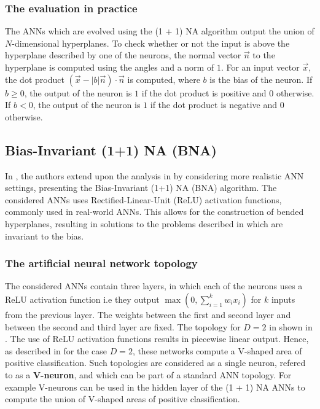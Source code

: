 \subsubsection{The evaluation in practice}

The ANNs which are evolved using the (1 + 1) NA algorithm output the union of $N$-dimensional hyperplanes. To check whether or not the input is above the
hyperplane described by one of the neurons, the normal vector $\overrightarrow{n}$ to the hyperplane is computed using the angles and a norm of $1$.
For an input vector $\overrightarrow{x}$, the dot product $(\overrightarrow{x} - \lvert b \rvert \overrightarrow{n}) \cdot \overrightarrow{n}$ is computed, where
$b$ is the bias of the neuron. If $b \geq 0$, the output of the neuron is $1$ if the dot product is positive and $0$ otherwise. If $b < 0$,
the output of the neuron is $1$ if the dot product is negative and $0$ otherwise.

\subsection{Bias-Invariant (1+1) NA (BNA)}

In \cite{bna}, the authors extend upon the analysis in \cite{na} by considering more realistic ANN settings, presenting the Bias-Invariant (1+1) NA (BNA) algorithm.
The considered ANNs uses Rectified-Linear-Unit (ReLU) activation functions, commonly used in real-world ANNs.
This allows for the construction of bended hyperplanes, resulting in solutions to the problems described in \cite{na} which are invariant to the bias.

\subsubsection{The artificial neural network topology}

The considered ANNs contain three layers, in which each of the neurons uses a ReLU activation function i.e they output $\max(0, \sum_{i=1}^k w_i x_i)$ for
$k$ inputs from the previous layer.
The weights between the first and second layer and between the second and third layer are fixed. The topology for $D = 2$ in shown in .
The use of ReLU activation functions results in piecewise linear output. Hence, as described in  for the case $D = 2$, these networks compute a
V-shaped area of positive classification. Such topologies are considered as a single neuron, refered to as a \textbf{V-neuron}, and which can be part of a
standard ANN topology. For example V-neurons can be used in the hidden layer of the (1 + 1) NA ANNs \cite{na} to compute the union of V-shaped areas of positive classification.

